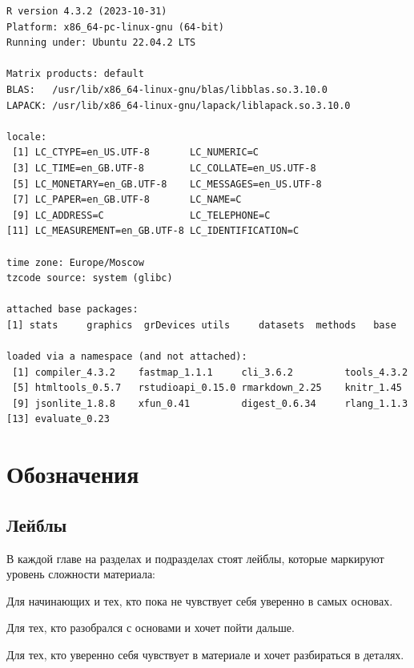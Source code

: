 \documentclass[
  letterpaper,
  DIV=11,
  numbers=noendperiod]{scrreprt}
\theoremstyle{definition}
\theoremstyle{remark}
\begin{document}
\begin{verbatim}
R version 4.3.2 (2023-10-31)
Platform: x86_64-pc-linux-gnu (64-bit)
Running under: Ubuntu 22.04.2 LTS

Matrix products: default
BLAS:   /usr/lib/x86_64-linux-gnu/blas/libblas.so.3.10.0 
LAPACK: /usr/lib/x86_64-linux-gnu/lapack/liblapack.so.3.10.0

locale:
 [1] LC_CTYPE=en_US.UTF-8       LC_NUMERIC=C              
 [3] LC_TIME=en_GB.UTF-8        LC_COLLATE=en_US.UTF-8    
 [5] LC_MONETARY=en_GB.UTF-8    LC_MESSAGES=en_US.UTF-8   
 [7] LC_PAPER=en_GB.UTF-8       LC_NAME=C                 
 [9] LC_ADDRESS=C               LC_TELEPHONE=C            
[11] LC_MEASUREMENT=en_GB.UTF-8 LC_IDENTIFICATION=C       

time zone: Europe/Moscow
tzcode source: system (glibc)

attached base packages:
[1] stats     graphics  grDevices utils     datasets  methods   base     

loaded via a namespace (and not attached):
 [1] compiler_4.3.2    fastmap_1.1.1     cli_3.6.2         tools_4.3.2      
 [5] htmltools_0.5.7   rstudioapi_0.15.0 rmarkdown_2.25    knitr_1.45       
 [9] jsonlite_1.8.8    xfun_0.41         digest_0.6.34     rlang_1.1.3      
[13] evaluate_0.23    
\end{verbatim}


\chapter*{Обозначения}\label{book_signs}


\section*{Лейблы}\label{book_labels}


В каждой главе на разделах и подразделах стоят лейблы, которые маркируют
уровень сложности материала:

Для начинающих и тех, кто пока не чувствует себя уверенно в самых
основах.

Для тех, кто разобрался с основами и хочет пойти дальше.

Для тех, кто уверенно себя чувствует в материале и хочет разбираться в
деталях.
\end{document}

